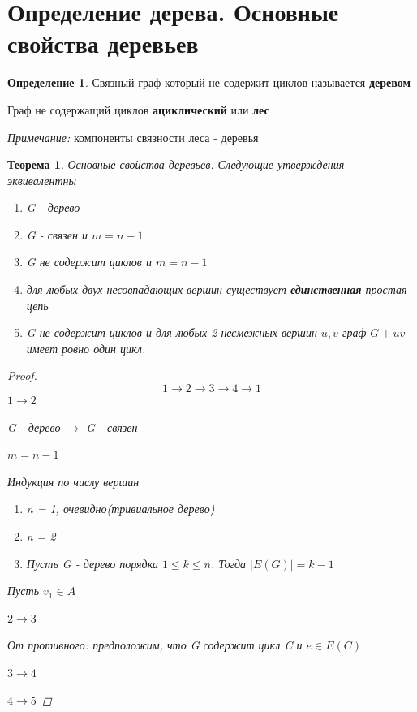 \documentclass[a4paper, 12pt]{article}
\newtheorem*{theorem*}{Теорема}
\theoremstyle{definition}
\newtheorem*{definition*}{Определение}
\theoremstyle{definition}
\renewcommand{\leq}{\leqslant}
\begin{document}
  \section{Определение дерева. Основные свойства деревьев}
  \begin{definition*}
    Связный граф который не содержит циклов называется \textbf{деревом}

    Граф не содержащий циклов \textbf{ациклический} или \textbf{лес}

    \textit{Примечание:} компоненты связности леса - деревья
  \end{definition*}
  \begin{theorem*}
    Основные свойства деревьев.
    Следующие утверждения эквивалентны
    \begin{enumerate}
      \item G - дерево
      \item G - связен и $m=n-1$
      \item G не содержит циклов и $m=n-1$
      \item для любых двух несовпадающих вершин существует \textbf{единственная} простая цепь
      \item G не содержит циклов и для любых 2 несмежных вершин $u,v$ граф $G+uv$ имеет ровно один цикл.
    \end{enumerate}
    \begin{proof}
      $$1\rightarrow2\rightarrow3\rightarrow4\rightarrow1$$
      $1\rightarrow2$

      G - дерево $\rightarrow$ G - связен

      $m=n-1$

      Индукция по числу вершин

      \begin{enumerate}
        \item n = 1, очевидно(тривиальное дерево)
        \item n = 2
        \item Пусть G - дерево порядка $1\leq k\le n$. Тогда $|E(G)|=k-1$
      \end{enumerate}

      Пусть $v_1\in A$

      $2\rightarrow3$

      От противного: предположим, что G содержит цикл C и $e\in E(C)$

      $3\rightarrow4$

      

      $4\rightarrow5$
    \end{proof}
  \end{theorem*}
\end{document}
